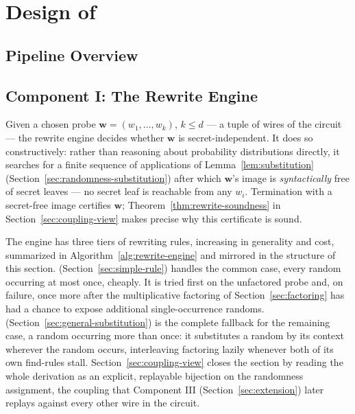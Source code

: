 \setlength{\parindent}{0pt}
\chapter{Design of \toolname}
\label{chap:design}
\section{Pipeline Overview}
\label{sec:pipeline-overview}
\section{Component I: The Rewrite Engine}
\label{sec:rewrite-engine}

Given a chosen probe $\mathbf{w} = (w_1, \dots, w_k)$, $k \le d$ --- a tuple of
wires of the circuit --- the rewrite engine decides whether $\mathbf{w}$ is
secret-independent. It does so constructively: rather than reasoning about
probability distributions directly, it searches for a finite sequence of
applications of Lemma~\ref{lem:substitution}
(Section~\ref{sec:randomness-substitution}) after which $\mathbf{w}$'s image is
\emph{syntactically} free of secret leaves --- no secret leaf is reachable from
any $w_i$. Termination with a secret-free image certifies $\mathbf{w}$;
Theorem~\ref{thm:rewrite-soundness} in Section~\ref{sec:coupling-view} makes precise
why this certificate is sound.

The engine has three tiers of rewriting rules, increasing in generality and cost,
summarized in
Algorithm~\ref{alg:rewrite-engine} and mirrored in the structure of this section.
 (Section~\ref{sec:simple-rule}) handles the common case,
every random occurring at most once, cheaply. It is tried first on the unfactored
probe and, on failure, once more after the multiplicative factoring of
Section~\ref{sec:factoring} has had a chance to expose additional single-occurrence
randoms.  (Section~\ref{sec:general-substitution}) is the
complete fallback for the remaining case, a random occurring more than once: it
substitutes a random by its context wherever the random occurs, interleaving
factoring lazily whenever both of its own find-rules stall. Section~\ref{sec:coupling-view}
closes the section by reading the whole derivation as an explicit, replayable
bijection on the randomness assignment, the \gls{coupling} that Component III
(Section~\ref{sec:extension}) later replays against every other wire in the circuit.

